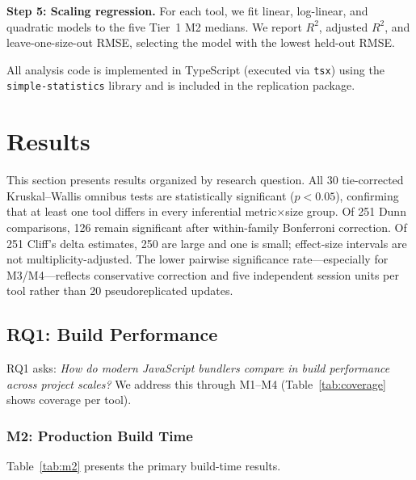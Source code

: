 \documentclass[preprint,12pt]{elsarticle}
\begin{document}
\textbf{Step 5: Scaling regression.}
For each tool, we fit linear, log-linear, and quadratic models to the five Tier~1 M2 medians.
We report $R^2$, adjusted $R^2$, and leave-one-size-out RMSE, selecting the model with the lowest held-out RMSE.

All analysis code is implemented in TypeScript (executed via \texttt{tsx}) using the \texttt{simple-statistics} library and is included in the replication package.


\section{Results}\label{sec:results}

This section presents results organized by research question.
All 30 tie-corrected Kruskal--Wallis omnibus tests are statistically significant ($p < 0.05$), confirming that at least one tool differs in every inferential metric$\times$size group.
Of 251 Dunn comparisons, 126 remain significant after within-family Bonferroni correction.
Of 251 Cliff's delta estimates, 250 are large and one is small; effect-size intervals are not multiplicity-adjusted.
The lower pairwise significance rate---especially for M3/M4---reflects conservative correction and five independent session units per tool rather than 20 pseudoreplicated updates.

\subsection{RQ1: Build Performance}\label{sec:rq1}

RQ1 asks: \emph{How do modern JavaScript bundlers compare in build performance across project scales?}
We address this through M1--M4 (Table~\ref{tab:coverage} shows coverage per tool).

\subsubsection{M2: Production Build Time}

Table~\ref{tab:m2} presents the primary build-time results.
\end{document}
